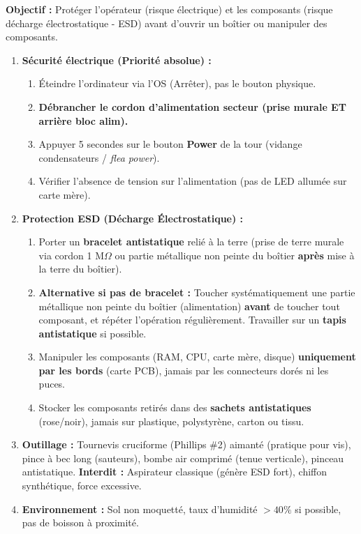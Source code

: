\documentclass[11pt]{article}
\begin{document}
\begin{methode}
    \textbf{Objectif :} Protéger l'opérateur (risque électrique) et les composants (risque décharge électrostatique - ESD) avant d'ouvrir un boîtier ou manipuler des composants.
    \begin{enumerate}
        \item \textbf{Sécurité électrique (Priorité absolue) :}
              \begin{enumerate}
                  \item Éteindre l'ordinateur via l'OS (Arrêter), pas le bouton physique.
                  \item \textbf{Débrancher le cordon d'alimentation secteur (prise murale ET arrière bloc alim).}
                  \item Appuyer 5 secondes sur le bouton \textbf{Power} de la tour (vidange condensateurs / \emph{flea power}).
                  \item Vérifier l'absence de tension sur l'alimentation (pas de LED allumée sur carte mère).
              \end{enumerate}
        \item \textbf{Protection ESD (Décharge Électrostatique) :}
              \begin{enumerate}
                  \item Porter un \textbf{bracelet antistatique} relié à la terre (prise de terre murale via cordon 1 M$\Omega$ ou partie métallique non peinte du boîtier \textbf{après} mise à la terre du boîtier).
                  \item \textbf{Alternative si pas de bracelet :} Toucher systématiquement une partie métallique non peinte du boîtier (alimentation) \textbf{avant} de toucher tout composant, et répéter l'opération régulièrement. Travailler sur un \textbf{tapis antistatique} si possible.
                  \item Manipuler les composants (RAM, CPU, carte mère, disque) \textbf{uniquement par les bords} (carte PCB), jamais par les connecteurs dorés ni les puces.
                  \item Stocker les composants retirés dans des \textbf{sachets antistatiques} (rose/noir), jamais sur plastique, polystyrène, carton ou tissu.
              \end{enumerate}
        \item \textbf{Outillage :} Tournevis cruciforme (Phillips \#2) aimanté (pratique pour vis), pince à bec long (sauteurs), bombe air comprimé (tenue verticale), pinceau antistatique. \textbf{Interdit :} Aspirateur classique (génère ESD fort), chiffon synthétique, force excessive.
        \item \textbf{Environnement :} Sol non moquetté, taux d'humidité $> 40\%$ si possible, pas de boisson à proximité.
    \end{enumerate}
\end{methode}
\end{document}
